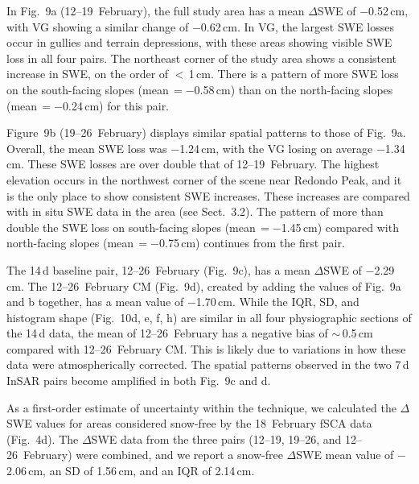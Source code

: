 In Fig.~9a (12--19~February), the full study area has a mean $\Delta$SWE of $-$0.52\,cm, with VG showing a similar change of $-$0.62\,cm. In VG, the largest SWE losses occur in gullies and terrain depressions, with these areas showing visible SWE loss in all four pairs. The northeast corner of the study area shows a consistent increase in SWE, on the order of $<$\,1\,cm. There is a pattern of more SWE loss on the south-facing slopes (mean\,$ = -0$.58\,cm) than on the north-facing slopes (mean\,$= -0$.24\,cm) for this pair.

Figure~9b (19--26~February) displays similar spatial patterns to those of Fig.~9a. Overall, the mean SWE loss was $-$1.24\,cm, with the VG losing on average $-$1.34\,cm. These SWE losses are over double that of 12--19~February. The highest elevation occurs in the northwest corner of the scene near Redondo Peak, and it is the only place to show consistent SWE increases. These increases are compared with in situ SWE data in the area (see Sect.~3.2). The pattern of more than double the SWE loss on south-facing slopes (mean\,$= -$1.45\,cm) compared with north-facing slopes (mean\,$= -$0.75\,cm) continues from the first pair.

The 14\,d baseline pair, 12--26~February (Fig.~9c), has a mean $\Delta$SWE of $-$2.29\,cm. The 12--26~February CM (Fig.~9d), created by adding the values of Fig.~9a and b together, has a mean value of $-$1.70\,cm. While the IQR, SD, and histogram shape (Fig.~10d, e, f, h) are similar in all four physiographic sections of the 14\,d data, the mean of 12--26~February has a negative bias of $\sim$\,0.5\,cm compared with 12--26~February CM. This is likely due to variations in how these data were atmospherically corrected. The spatial patterns observed in the two 7\,d InSAR pairs become amplified in both Fig.~9c and d.

As a first-order estimate of uncertainty within the technique, we calculated the $\Delta$SWE values for areas considered snow-free by the 18~February fSCA data (Fig.~4d). The $\Delta$SWE data from the three pairs (12--19, 19--26, and 12--26~February) were combined, and we report a snow-free $\Delta$SWE mean value of $-$2.06\,cm, an SD of 1.56\,cm, and an IQR of 2.14\,cm.

